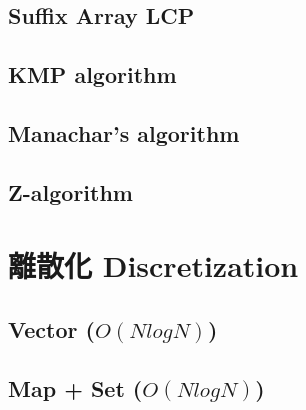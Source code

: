     \subsection{Suffix Array LCP}
        
    \subsection{KMP algorithm}
        
    \subsection{Manachar's algorithm}
        
    \subsection{Z-algorithm}
        

\section{離散化 Discretization}
    \subsection{Vector ($O(NlogN)$)}
        
    \subsection{Map + Set ($O(NlogN)$)}
        